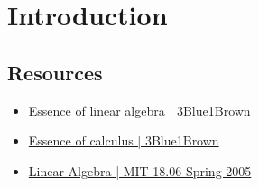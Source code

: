 \chapter{Introduction}

\section{Resources}
\begin{itemize}
	\item \href{https://youtube.com/playlist?list=PLZHQObOWTQDPD3MizzM2xVFitgF8hE_ab}{Essence of linear algebra | 3Blue1Brown}
	\item \href{https://youtube.com/playlist?list=PLZHQObOWTQDMsr9K-rj53DwVRMYO3t5Yr}{Essence of calculus | 3Blue1Brown}
	\item \href{https://youtube.com/playlist?list=PLE7DDD91010BC51F8}{Linear Algebra | MIT 18.06 Spring 2005}
\end{itemize}